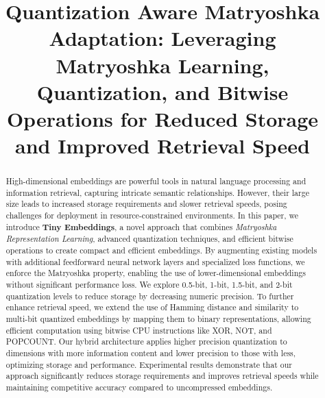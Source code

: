 \documentclass[acmtog, authorversion]{acmart}
\begin{document}


\title[Quantization Aware Matryoshka Adaptation]{Quantization Aware Matryoshka Adaptation: Leveraging Matryoshka Learning, Quantization, and Bitwise Operations for Reduced Storage and Improved Retrieval Speed}



\begin{abstract}  
  High-dimensional embeddings are powerful tools in natural language processing and information retrieval, capturing intricate semantic relationships. 
  However, their large size leads to increased storage requirements and slower retrieval speeds, posing challenges for deployment in resource-constrained environments. 
  In this paper, we introduce \textbf{Tiny Embeddings}, a novel approach that combines \textit{Matryoshka Representation Learning}, advanced quantization techniques, and efficient bitwise operations to create compact and efficient embeddings. 
  By augmenting existing models with additional feedforward neural network layers and specialized loss functions, we enforce the Matryoshka property, enabling the use of lower-dimensional embeddings without significant performance loss. 
  We explore 0.5-bit, 1-bit, 1.5-bit, and 2-bit quantization levels to reduce storage by decreasing numeric precision. 
  To further enhance retrieval speed, we extend the use of Hamming distance and similarity to multi-bit quantized embeddings by mapping them to binary representations, allowing efficient computation using bitwise CPU instructions like XOR, NOT, and POPCOUNT. 
  Our hybrid architecture applies higher precision quantization to dimensions with more information content and lower precision to those with less, optimizing storage and performance. 
  Experimental results demonstrate that our approach significantly reduces storage requirements and improves retrieval speeds while maintaining competitive accuracy compared to uncompressed embeddings.  
  
  \end{abstract} 
\end{document}

